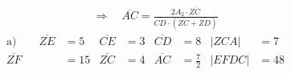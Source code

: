\begin{exercise}
\begin{equation*}
\begin{split}
        &\quad\Rightarrow\quad
        \overline{AC}=\frac{2A_2\cdot\overline{ZC}}{\overline{CD}\cdot\left(\overline{ZC}+\overline{ZD}\right)}
      \end{split}
    \end{equation*}
  \fi
  \ifoutcome\outcome
    \begingroup
      \newcommand{\aZE}{\num{5}}%
      \newcommand{\aZF}{\num{15}}%
      \newcommand{\aDF}{\num{9}}%
      \newcommand{\aZEC}{\num{6}}%
      \newcommand{\aCDBA}{\num{56}}%
      \newcommand{\aCE}{\num{3}}%
      \newcommand{\aZC}{\num{4}}%
      \newcommand{\aZD}{\num{12}}%
      \newcommand{\aCD}{\num{8}}%
      \newcommand{\aAC}{\frac{\num{7}}{\num{2}}}%
      \newcommand{\aBD}{\frac{\num{21}}{\num{2}}}%
      \newcommand{\aZCA}{\num{7}}%
      \newcommand{\aEFDC}{\num{48}}%
      \newcommand{\bZE}{\num{13}}%
      \newcommand{\bZF}{\num{39}}%
      \newcommand{\bDF}{\num{15}}%
      \newcommand{\bZEC}{\num{30}}%
      \newcommand{\bCDBA}{\num{168}}%
      \newcommand{\bCE}{\num{5}}%
      \newcommand{\bZC}{\num{12}}%
      \newcommand{\bZD}{\num{36}}%
      \newcommand{\bCD}{\num{24}}%
      \newcommand{\bAC}{\frac{\num{7}}{\num{2}}}%
      \newcommand{\bBD}{\frac{\num{21}}{\num{2}}}%
      \newcommand{\bZCA}{\num{21}}%
      \newcommand{\bEFDC}{\num{240}}%
      \newcommand{\cZE}{\num{17}}%
      \newcommand{\cZF}{\num{68}}%
      \newcommand{\cDF}{\num{32}}%
      \newcommand{\cZEC}{\num{60}}%
      \newcommand{\cCDBA}{\num{360}}%
      \newcommand{\cCE}{\num{8}}%
      \newcommand{\cZC}{\num{15}}%
      \newcommand{\cZD}{\num{60}}%
      \newcommand{\cCD}{\num{45}}%
      \newcommand{\cAC}{\frac{\num{16}}{\num{5}}}%
      \newcommand{\cBD}{\frac{\num{64}}{\num{5}}}%
      \newcommand{\cZCA}{\num{24}}%
      \newcommand{\cEFDC}{\num{900}}%
      \newcommand{\dZE}{\num{53}}%
      \newcommand{\dZF}{\num{212}}%
      \newcommand{\dDF}{\num{180}}%
      \newcommand{\dZEC}{\num{630}}%
      \newcommand{\dCDBA}{\num{420}}%
      \newcommand{\dCE}{\num{45}}%
      \newcommand{\dZC}{\num{28}}%
      \newcommand{\dZD}{\num{112}}%
      \newcommand{\dCD}{\num{84}}%
      \newcommand{\dAC}{\num{2}}%
      \newcommand{\dBD}{\num{8}}%
      \newcommand{\dZCA}{\num{28}}%
      \newcommand{\dEFDC}{\num{9450}}%
      \begin{align*}
        \text{a)}\qquad\overline{ZE}&=\aZE   & \overline{CE}&=\aCE & \overline{CD}&=\aCD &  |ZCA|&=\aZCA  \\
                       \overline{ZF}&=\aZF   & \overline{ZC}&=\aZC & \overline{AC}&=\aAC & |EFDC|&=\aEFDC \\

\end{align*}
\end{exercise}
